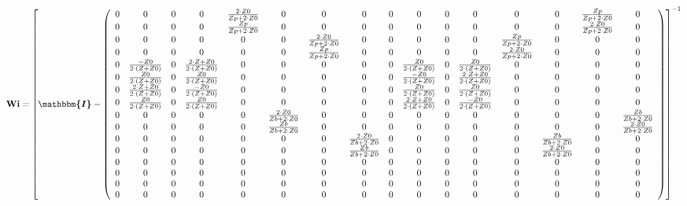 \[ \mathbf{Wi} =  \left[ \boldsymbol{\mathbbm{I}}  -
\left(\begin{array}{cccccccccccccccc} 0 & 0 & 0 & 0 & \frac{2\cdot
Z0}{Zp+2\cdot Z0} & 0 & 0 & 0 & 0 & 0 & 0 & 0 & 0 & 0 &
\frac{Zp}{Zp+2\cdot Z0} & 0 \\ 0 & 0 & 0 & 0 & \frac{Zp}{Zp+2\cdot Z0}
& 0 & 0 & 0 & 0 & 0 & 0 & 0 & 0 & 0 & \frac{2\cdot Z0}{Zp+2\cdot Z0} &
0 \\ 0 & 0 & 0 & 0 & 0 & 0 & \frac{2\cdot Z0}{Zp+2\cdot Z0} & 0 & 0 &
0 & 0 & 0 & \frac{Zp}{Zp+2\cdot Z0} & 0 & 0 & 0 \\ 0 & 0 & 0 & 0 & 0 &
0 & \frac{Zp}{Zp+2\cdot Z0} & 0 & 0 & 0 & 0 & 0 & \frac{2\cdot
Z0}{Zp+2\cdot Z0} & 0 & 0 & 0 \\ 0 & \frac{-Z0}{2\cdot
\left(Z+Z0\right)} & 0 & \frac{2\cdot Z+Z0}{2\cdot \left(Z+Z0\right)}
& 0 & 0 & 0 & 0 & 0 & \frac{Z0}{2\cdot \left(Z+Z0\right)} & 0 &
\frac{Z0}{2\cdot \left(Z+Z0\right)} & 0 & 0 & 0 & 0 \\ 0 &
\frac{Z0}{2\cdot \left(Z+Z0\right)} & 0 & \frac{Z0}{2\cdot
\left(Z+Z0\right)} & 0 & 0 & 0 & 0 & 0 & \frac{-Z0}{2\cdot
\left(Z+Z0\right)} & 0 & \frac{2\cdot Z+Z0}{2\cdot \left(Z+Z0\right)}
& 0 & 0 & 0 & 0 \\ 0 & \frac{2\cdot Z+Z0}{2\cdot \left(Z+Z0\right)} &
0 & \frac{-Z0}{2\cdot \left(Z+Z0\right)} & 0 & 0 & 0 & 0 & 0 &
\frac{Z0}{2\cdot \left(Z+Z0\right)} & 0 & \frac{Z0}{2\cdot
\left(Z+Z0\right)} & 0 & 0 & 0 & 0 \\ 0 & \frac{Z0}{2\cdot
\left(Z+Z0\right)} & 0 & \frac{Z0}{2\cdot \left(Z+Z0\right)} & 0 & 0 &
0 & 0 & 0 & \frac{2\cdot Z+Z0}{2\cdot \left(Z+Z0\right)} & 0 &
\frac{-Z0}{2\cdot \left(Z+Z0\right)} & 0 & 0 & 0 & 0 \\ 0 & 0 & 0 & 0
& 0 & \frac{2\cdot Z0}{Zb+2\cdot Z0} & 0 & 0 & 0 & 0 & 0 & 0 & 0 & 0 &
0 & \frac{Zb}{Zb+2\cdot Z0} \\ 0 & 0 & 0 & 0 & 0 & \frac{Zb}{Zb+2\cdot
Z0} & 0 & 0 & 0 & 0 & 0 & 0 & 0 & 0 & 0 & \frac{2\cdot Z0}{Zb+2\cdot
Z0} \\ 0 & 0 & 0 & 0 & 0 & 0 & 0 & \frac{2\cdot Z0}{Zb+2\cdot Z0} & 0
& 0 & 0 & 0 & 0 & \frac{Zb}{Zb+2\cdot Z0} & 0 & 0 \\ 0 & 0 & 0 & 0 & 0
& 0 & 0 & \frac{Zb}{Zb+2\cdot Z0} & 0 & 0 & 0 & 0 & 0 & \frac{2\cdot
Z0}{Zb+2\cdot Z0} & 0 & 0 \\ 0 & 0 & 0 & 0 & 0 & 0 & 0 & 0 & 0 & 0 & 0
& 0 & 0 & 0 & 0 & 0 \\ 0 & 0 & 0 & 0 & 0 & 0 & 0 & 0 & 0 & 0 & 0 & 0 &
0 & 0 & 0 & 0 \\ 0 & 0 & 0 & 0 & 0 & 0 & 0 & 0 & 0 & 0 & 0 & 0 & 0 & 0
& 0 & 0 \\ 0 & 0 & 0 & 0 & 0 & 0 & 0 & 0 & 0 & 0 & 0 & 0 & 0 & 0 & 0 &
0 \end{array}\right) \right]^{-1}  \]
